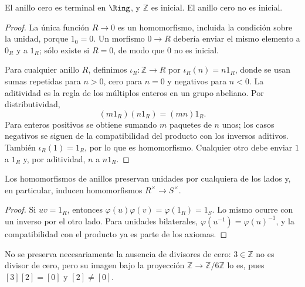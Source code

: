 \begin{prop}\label{prop:C11-inicial}
El anillo cero es terminal en $\Ring$, y $\mathbb Z$ es inicial. El anillo cero no es inicial.
\end{prop}
\begin{proof}
La única función $R\to0$ es un homomorfismo, incluida la condición sobre la unidad, porque $1_0=0$. Un morfismo $0\to R$ debería enviar el mismo elemento a $0_R$ y a $1_R$; sólo existe si $R=0$, de modo que $0$ no es inicial.

Para cualquier anillo $R$, definimos $\iota_R:\mathbb Z\to R$ por $\iota_R(n)=n1_R$, donde se usan sumas repetidas para $n>0$, cero para $n=0$ y negativos para $n<0$. La aditividad es la regla de los múltiplos enteros en un grupo abeliano. Por distributividad,
\[
(m1_R)(n1_R)=(mn)1_R.
\]
Para enteros positivos se obtiene sumando $m$ paquetes de $n$ unos; los casos negativos se siguen de la compatibilidad del producto con los inversos aditivos. También $\iota_R(1)=1_R$, por lo que es homomorfismo. Cualquier otro debe enviar $1$ a $1_R$ y, por aditividad, $n$ a $n1_R$.
\end{proof}

\begin{prop}
Los homomorfismos de anillos preservan unidades por cualquiera de los lados y, en particular, inducen homomorfismos $R^\times\to S^\times$.
\end{prop}
\begin{proof}
Si $uv=1_R$, entonces $\varphi(u)\varphi(v)=\varphi(1_R)=1_S$. Lo mismo ocurre con un inverso por el otro lado. Para unidades bilaterales, $\varphi(u^{-1})=\varphi(u)^{-1}$, y la compatibilidad con el producto ya es parte de los axiomas.
\end{proof}
\begin{ejem}
No se preserva necesariamente la ausencia de divisores de cero: $3\in\mathbb Z$ no es divisor de cero, pero su imagen bajo la proyección $\mathbb Z\to\mathbb Z/6\mathbb Z$ lo es, pues $[3][2]=[0]$ y $[2]\ne[0]$.
\end{ejem}

